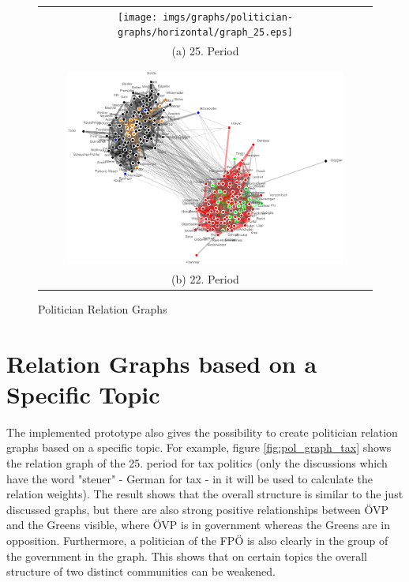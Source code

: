 \begin{figure}
\center
\begin{tabular}{ c }
	\texttt{[image: imgs/graphs/politician-graphs/horizontal/graph\_25.eps]}
	\\
	(a) 25. Period
	\\
	\\
	\hline
	\\
	
	\includegraphics[width=0.85\textwidth]{imgs/graphs/politician-graphs/horizontal/graph_22.eps}
	\\
	(b) 22. Period
\end{tabular}
	
	
	\caption{Politician Relation Graphs}
	\label{fig:pol_graphs1}
\end{figure}

\section{Relation Graphs based on a Specific Topic}
The implemented prototype also gives the possibility to create politician relation graphs based on a specific topic. For example, figure \ref{fig:pol_graph_tax} shows the relation graph of the 25. period for tax politics (only the discussions which have the word "steuer" - German for tax - in it will be used to calculate the relation weights). The result shows that the overall structure is similar to the just discussed graphs, but there are also strong positive relationships between ÖVP and the Greens visible, where ÖVP is in government whereas the Greens are in opposition. Furthermore, a politician of the FPÖ is also clearly in the group of the government in the graph. This shows that on certain topics the overall structure of two distinct communities can be weakened.

